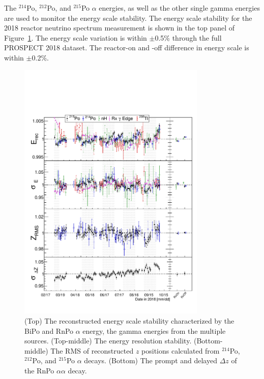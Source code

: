 The $^{214}$Po, $^{212}$Po, and $^{215}$Po $\alpha$ energies, as well as the other single gamma energies are used  to monitor the energy scale stability. 
The energy scale stability for the 2018 reactor neutrino spectrum measurement is shown in the top panel of Figure~\ref{fig:StabilityTime}.
The energy scale variation is within $\pm$0.5\% through the full PROSPECT 2018 dataset.
The reactor-on and -off difference in energy scale is within $\pm$0.2\%.

\begin{figure}[h!]
\centering
\includegraphics[width=0.8\textwidth]{Figures/StabilityVsTime.pdf}
\caption[Detector stability characterization]{
(Top) The reconstructed energy scale stability characterized by the BiPo and RnPo $\alpha$ energy, the gamma energies from the multiple sources.
(Top-middle) The energy resolution stability. 
(Bottom-middle) The RMS of reconstructed $z$ positions calculated from $^{214}$Po, $^{212}$Po, and $^{215}$Po $\alpha$ decays.
(Bottom) The prompt and delayed $\Delta z$ of the RnPo $\alpha\alpha$ decay.}
\label{fig:StabilityTime}
\end{figure}

